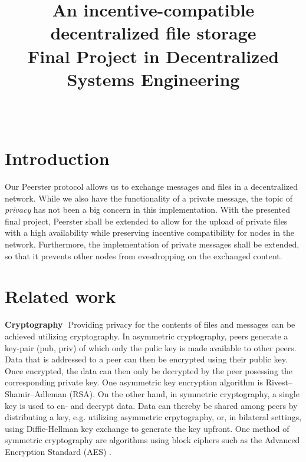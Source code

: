 \documentclass{article}
\title{
\vspace{-10mm}\fontsize{19pt}{10pt}\selectfont
\textbf{An incentive-compatible decentralized file storage}\\
\vspace{0.5em}\fontsize{12pt}{10pt}\selectfont
\textbf{Final Project in Decentralized Systems Engineering}\\
\vspace{0.7em}\fontsize{12pt}{10pt}\selectfont
\text{Carolin Beer, SCIPER Nr. 294852}\\
\vspace{-4ex}
}
\author{}
\date{}
\begin{document}
\maketitle %
\thispagestyle{fancy} %
\newcommand{\elem}[1]{\noindent\textbf{#1}\,\,}
\section*{Introduction}
Our Peerster protocol allows us to exchange messages and files in a decentralized network. While we also have the functionality of a private message, the topic of \emph{privacy} has not been a big concern in this implementation. 
With the presented final project, Peerster shall be extended to allow for the upload of private files with a high availability while preserving incentive compatibility for nodes in the network. Furthermore, the implementation of private messages shall be extended, so that it prevents other nodes from evesdropping on the exchanged content.

\section*{Related work}
\elem{Cryptography}
Providing privacy for the contents of files and messages can be achieved utilizing cryptography. In asymmetric cryptography, peers generate a key-pair (pub, priv) of which only the pulic key is made available to other peers. Data that is addressed to a peer can then be encrypted using their public key. Once encrypted, the data can then only be decrypted by the peer posessing the corresponding private key. One asymmetric key encryption algorithm is Rivest–Shamir–Adleman (RSA).
On the other hand, in symmetric cryptography, a single key is used to en- and decrypt data. Data can thereby be shared among peers by distributing a key, e.g. utilizing asymmetric crpytography, or, in bilateral settings, using Diffie-Hellman key exchange to generate the key upfront. One method of symmetric cryptography are algorithms using block ciphers such as the Advanced Encryption Standard (AES) \citep{Smart.2002}.
\\\vspace{0.5em}
\end{document}
